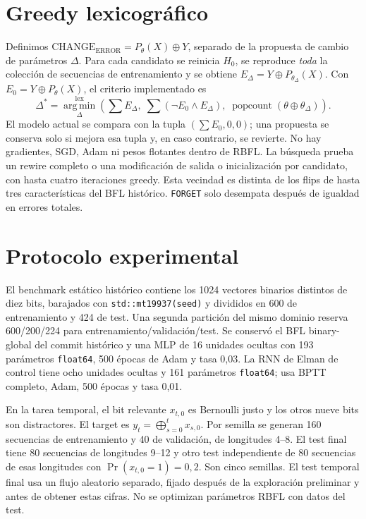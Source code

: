 \documentclass[10pt,a4paper]{article}
\newcommand{\CE}{\mathrm{CHANGE}_{\mathrm{ERROR}}}
\begin{document}
\section{Greedy lexicográfico}
Definimos $\CE=P_{\theta}(X)\oplus Y$, separado de la propuesta de cambio de parámetros $\Delta$. Para cada candidato se reinicia $H_0$, se reproduce \emph{toda} la colección de secuencias de entrenamiento y se obtiene $E_\Delta=Y\oplus P_{\theta_\Delta}(X)$. Con $E_0=Y\oplus P_\theta(X)$, el criterio implementado es
\begin{equation}
\Delta^*=\operatorname*{arg\,min}^{\mathrm{lex}}_{\Delta}
\left(\sum E_\Delta,\;\sum(\neg E_0\land E_\Delta),\;
\operatorname{popcount}(\theta\oplus\theta_\Delta)\right).
\end{equation}
El modelo actual se compara con la tupla $(\sum E_0,0,0)$; una propuesta se conserva solo si mejora esa tupla y, en caso contrario, se revierte. No hay gradientes, SGD, Adam ni pesos flotantes dentro de RBFL. La búsqueda prueba un rewire completo o una modificación de salida o inicialización por candidato, con hasta cuatro iteraciones greedy. Esta vecindad es distinta de los flips de hasta tres características del BFL histórico. \texttt{FORGET} solo desempata después de igualdad en errores totales.

\section{Protocolo experimental}
El benchmark estático histórico contiene los 1024 vectores binarios distintos de diez bits, barajados con \texttt{std::mt19937(seed)} y divididos en 600 de entrenamiento y 424 de test. Una segunda partición del mismo dominio reserva 600/200/224 para entrenamiento/validación/test. Se conservó el BFL binary-global del commit histórico y una MLP de 16 unidades ocultas con 193 parámetros \texttt{float64}, 500 épocas de Adam y tasa 0,03. La RNN de Elman de control tiene ocho unidades ocultas y 161 parámetros \texttt{float64}; usa BPTT completo, Adam, 500 épocas y tasa 0,01.

En la tarea temporal, el bit relevante $x_{t,0}$ es Bernoulli justo y los otros nueve bits son distractores. El target es $y_t=\bigoplus_{s=0}^{t}x_{s,0}$. Por semilla se generan 160 secuencias de entrenamiento y 40 de validación, de longitudes 4--8. El test final tiene 80 secuencias de longitudes 9--12 y otro test independiente de 80 secuencias de esas longitudes con $\Pr(x_{t,0}=1)=0,2$. Son cinco semillas. El test temporal final usa un flujo aleatorio separado, fijado después de la exploración preliminar y antes de obtener estas cifras. No se optimizan parámetros RBFL con datos del test.
\end{document}
